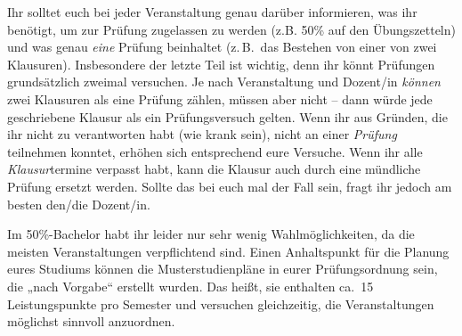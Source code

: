 Ihr solltet euch bei jeder Veranstaltung genau darüber informieren, was ihr benötigt, um zur Prüfung zugelassen zu werden (z.B. 50\% auf den Übungszetteln) und was genau \emph{eine} Prüfung beinhaltet (z.\,B.\ das Bestehen von einer von zwei Klausuren). Insbesondere der letzte Teil ist wichtig, denn ihr könnt Prüfungen grundsätzlich zweimal versuchen. Je nach Veranstaltung und Dozent/in \emph{können} zwei Klausuren als eine Prüfung zählen, müssen aber nicht -- dann würde jede geschriebene Klausur als ein Prüfungsversuch gelten. Wenn ihr aus Gründen, die ihr nicht zu verantworten habt (wie krank sein), nicht an einer \emph{Prüfung} teilnehmen konntet, erhöhen sich entsprechend eure Versuche. Wenn ihr alle \emph{Klausur}termine verpasst habt, kann die Klausur auch durch eine mündliche Prüfung ersetzt werden. Sollte das bei euch mal der Fall sein, fragt ihr jedoch am besten den/die Dozent/in.

Im 50\%-Bachelor habt ihr leider nur sehr wenig Wahlmöglichkeiten, da die meisten Veranstaltungen verpflichtend sind. Einen Anhaltspunkt für die Planung eures Studiums können die Musterstudienpläne in eurer Prüfungsordnung sein, die „nach Vorgabe“ erstellt wurden. Das heißt, sie enthalten ca.\ 15 Leistungspunkte pro Semester und versuchen gleichzeitig, die Veranstaltungen möglichst sinnvoll anzuordnen.
